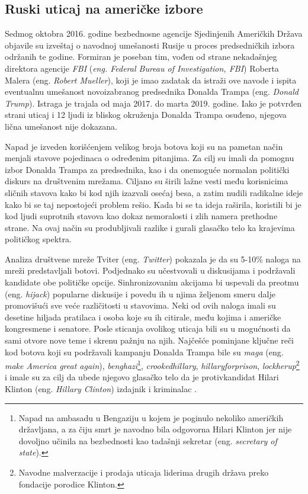 \documentclass[a4paper]{article}
\begin{document}
\subsection{Ruski uticaj na američke izbore}
\label{no_collusion_witch_hunt}
Sedmog oktobra 2016. godine bezbednosne agencije Sjedinjenih Američkih Država objavile su izveštaj o navodnoj umešanosti Rusije u proces predsedničkih izbora održanih te godine. Formiran je poseban tim, vođen od strane nekadašnjeg direktora agencije \textit{FBI} (\textit{eng. Federal Bureau of Investigation, FBI}) Roberta Malera (eng. \textit{Robert Mueller}), koji je imao zadatak da istraži ove navode i ispita eventualnu umešanost novoizabranog predsednika Donalda Trampa (eng. \textit{Donald Trump}). Istraga je trajala od maja 2017. do marta 2019. godine. Iako je potvrđen strani uticaj i 12 ljudi iz bliskog okruženja Donalda Trampa osuđeno, njegova lična umešanost nije dokazana.

Napad je izveden korišćenjem velikog broja botova koji su na pametan način menjali stavove pojedinaca o određenim pitanjima. Za cilj su imali da pomognu izbor Donalda Trampa za predsednika, kao i da onemoguće normalan politički diskurs na društvenim mrežama. Ciljano su širili lažne vesti među korisnicima sličnih stavova kako bi kod njih izazvali osećaj besa, a zatim nudili radikalne ideje kako bi se taj nepostojeći problem rešio. Kada bi se ta ideja raširila, koristili bi je kod ljudi suprotnih stavova kao dokaz nemoralosti i zlih namera prethodne strane. Na ovaj način su produbljivali razlike i gurali glasačko telo ka krajevima političkog spektra.

Analiza društvene mreže Tviter (eng. \textit{Twitter}) pokazala je da su 5-10\% naloga na mreži predstavljali botovi. Podjednako su učestvovali u diskusijama i podržavali kandidate obe političke opcije. Sinhronizovanim akcijama bi uspevali da preotmu (eng. \textit{hijack}) popularne diskusije i povedu ih u njima željenom smeru dalje promovišući sve veće različitosti u stavovima. Neki od ovih naloga imali su desetine hiljada pratilaca i osoba koje su ih citirale, među kojima i američke kongresmene i senatore. Posle sticanja ovolikog uticaja bili su u mogućnosti da sami otvore nove teme i skrenu pažnju na njih. Najčešće pominjane ključne reči kod botova koji su podržavali kampanju Donalda Trampa bile su \textit{maga} (eng. \textit{make America great again}), \textit{benghazi}\footnote{Napad na ambasadu u Bengaziju u kojem je poginulo nekoliko američkih državljana, a za čiju smrt je navodno bila odgovorna Hilari Klinton jer nije dovoljno učinila na bezbednosti kao tadašnji sekretar (eng. \textit{secretary of state}).}, \textit{crookedhillary}, \textit{hillaryforprison}, \textit{lockherup}\footnote{Navodne malverzacije i prodaja uticaja liderima drugih država preko fondacije porodice Klinton.} i imale su za cilj da ubede njegovo glasačko telo da je protivkandidat Hilari Klinton (eng. \textit{Hillary Clinton}) izdajnik i kriminalac \cite{fake_news}.
\end{document}
